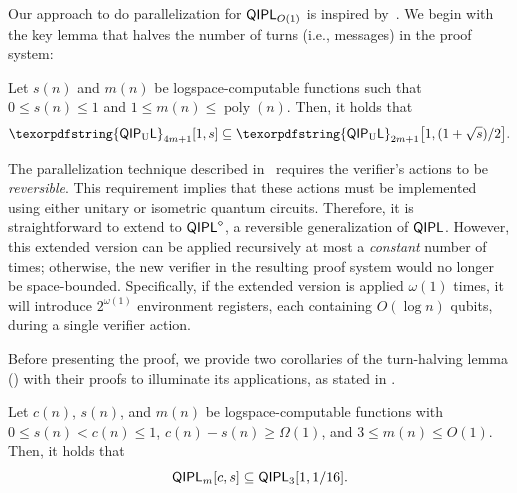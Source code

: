 \documentclass[11pt, a4paper]{article}
\numberwithin{equation}{section}
\numberwithin{figure}{section}
\newcommand{\QIPL}{\textnormal{\textsf{QIPL}}\xspace}
\newcommand{\QIPLconst}{\texorpdfstring{\textnormal{\textsf{QIPL}\textsubscript{O(1)}}}\xspace}
\newcommand{\QIPUL}{\texorpdfstring{\textnormal{\textsf{QIP}\textsubscript{\textnormal{U}}\textsf{L}}}\xspace}
\DeclarePairedDelimiter\sbra{\lbrack}{\rbrack}
\DeclareMathOperator\poly{poly}
\begin{document}
Our approach to do parallelization for $\QIPL_{O(1)}$ is inspired by~\cite[Section 4]{KKMV09}. We begin with the key lemma that halves the number of turns (i.e., messages) in the proof system:

\begin{lemma}
    \label{lemma:QIPL-halving-parallelization}
    Let $s(n)$ and $m(n)$ be logspace-computable functions such that $0 \leq s(n) \leq 1$ and $1 \leq m(n) \leq \poly(n)$. Then, it holds that
    \[ \QIPUL_{4m+1}[1,s] \subseteq \QIPUL_{2m+1}\sbra*{1,(1+\sqrt{s})/2}. \]
\end{lemma}

\begin{remark}
    \label{remark:turn-havling-limitations}
    The parallelization technique described in~\cite[Section 4]{KKMV09} requires the verifier's actions to be \textit{reversible}. This requirement implies that these actions must be implemented using either unitary or isometric quantum circuits. Therefore, it is straightforward to extend  to $\QIPL^{\diamond}$, a reversible generalization of $\QIPL{}$. However, this extended version can be applied recursively at most a \textit{constant} number of times; otherwise, the new verifier in the resulting proof system would no longer be space-bounded. Specifically, if the extended version is applied $\omega(1)$ times, it will introduce $2^{\omega(1)}$ environment registers, each containing $O(\log n)$ qubits, during a single verifier action. 
\end{remark}

\vspace{1em}
Before presenting the proof, we provide two corollaries of the turn-halving lemma () with their proofs to illuminate its applications, as stated in . 

\begin{corollary}[$\QIPLconst \subseteq \QIPL_3$]
    \label{corr:QIPLconst-in-QIPL3}
    Let $c(n)$, $s(n)$, and $m(n)$ be logspace-computable functions with $0 \leq s(n) < c(n) \leq 1$, $c(n) - s(n) \geq \Omega(1)$, and $3 \leq m(n) \leq O(1)$. Then, it holds that 
    \[ \QIPL_m[c,s] \subseteq \QIPL_3[1,1/16]. \]
\end{corollary}
\end{document}
